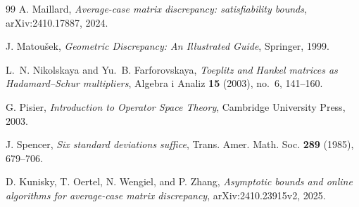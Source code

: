 \documentclass[11pt]{amsart}
\numberwithin{equation}{section}
\theoremstyle{definition}
\theoremstyle{remark}
\begin{document}
\begin{thebibliography}{99}
A. Maillard,
\emph{Average-case matrix discrepancy: satisfiability bounds},
arXiv:2410.17887, 2024.

J. Matou\v{s}ek,
\emph{Geometric Discrepancy: An Illustrated Guide},
Springer, 1999.

L.~N. Nikolskaya and Yu.~B. Farforovskaya,
\emph{Toeplitz and Hankel matrices as Hadamard--Schur multipliers},
Algebra i Analiz \textbf{15} (2003), no.~6, 141--160.

G. Pisier,
\emph{Introduction to Operator Space Theory},
Cambridge University Press, 2003.

J. Spencer,
\emph{Six standard deviations suffice},
Trans. Amer. Math. Soc. \textbf{289} (1985), 679--706.

D. Kunisky, T. Oertel, N. Wengiel, and P. Zhang,
\emph{Asymptotic bounds and online algorithms for average-case matrix discrepancy},
arXiv:2410.23915v2, 2025.

\end{thebibliography}
\end{document}
